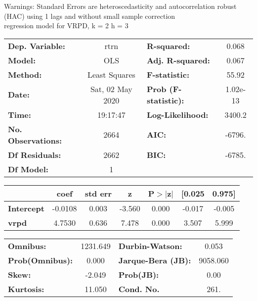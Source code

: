 Warnings: \newline
 [1] Standard Errors are heteroscedasticity and autocorrelation robust (HAC) using 1 lags and without small sample correction\\ 

regression model for VRPD, k = 2 h = 3\begin{center}
\begin{tabular}{lclc}
\toprule
\textbf{Dep. Variable:}    &       rtrn       & \textbf{  R-squared:         } &     0.068   \\
\textbf{Model:}            &       OLS        & \textbf{  Adj. R-squared:    } &     0.067   \\
\textbf{Method:}           &  Least Squares   & \textbf{  F-statistic:       } &     55.92   \\
\textbf{Date:}             & Sat, 02 May 2020 & \textbf{  Prob (F-statistic):} &  1.02e-13   \\
\textbf{Time:}             &     19:17:47     & \textbf{  Log-Likelihood:    } &    3400.2   \\
\textbf{No. Observations:} &        2664      & \textbf{  AIC:               } &    -6796.   \\
\textbf{Df Residuals:}     &        2662      & \textbf{  BIC:               } &    -6785.   \\
\textbf{Df Model:}         &           1      & \textbf{                     } &             \\
\bottomrule
\end{tabular}
\begin{tabular}{lcccccc}
                   & \textbf{coef} & \textbf{std err} & \textbf{z} & \textbf{P$> |$z$|$} & \textbf{[0.025} & \textbf{0.975]}  \\
\midrule
\textbf{Intercept} &      -0.0108  &        0.003     &    -3.560  &         0.000        &       -0.017    &       -0.005     \\
\textbf{vrpd}      &       4.7530  &        0.636     &     7.478  &         0.000        &        3.507    &        5.999     \\
\bottomrule
\end{tabular}
\begin{tabular}{lclc}
\textbf{Omnibus:}       & 1231.649 & \textbf{  Durbin-Watson:     } &    0.053  \\
\textbf{Prob(Omnibus):} &   0.000  & \textbf{  Jarque-Bera (JB):  } & 9058.060  \\
\textbf{Skew:}          &  -2.049  & \textbf{  Prob(JB):          } &     0.00  \\
\textbf{Kurtosis:}      &  11.050  & \textbf{  Cond. No.          } &     261.  \\
\bottomrule
\end{tabular}
\end{center}

